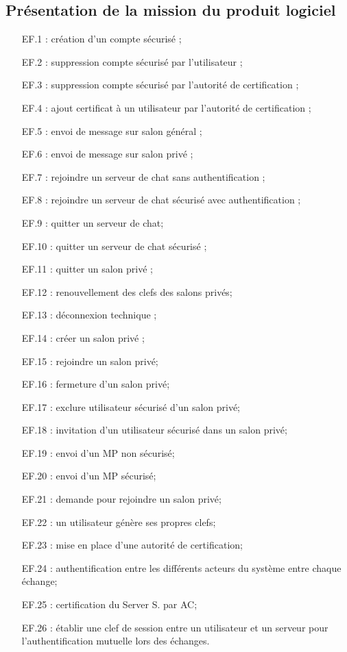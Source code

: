 \documentclass[a4paper,11pt,french]{article}
\begin{document}
\subsection{Présentation de la mission du produit logiciel}
\begin{itemize}
\item [EF.1] : création d'un compte sécurisé ;
\item [EF.2] : suppression compte sécurisé par l'utilisateur ;
\item [EF.3] : suppression compte sécurisé par l'autorité de certification ;
\item [EF.4] : ajout certificat à un utilisateur par l'autorité de certification ;
\item [EF.5] : envoi de message sur salon général ;
\item [EF.6] : envoi de message sur salon privé ;
\item [EF.7] : rejoindre un serveur de chat sans authentification ;
\item [EF.8] : rejoindre un serveur de chat sécurisé avec authentification ;
\item [EF.9] : quitter un serveur de chat;
\item [EF.10] : quitter un serveur de chat sécurisé ;
\item [EF.11] : quitter un salon privé ;
\item [EF.12] : renouvellement des clefs des salons privés;
\item [EF.13] : déconnexion technique ;
\item [EF.14] : créer un salon privé ;
\item [EF.15] : rejoindre un salon privé;
\item [EF.16] : fermeture d'un salon privé;
\item [EF.17] : exclure utilisateur sécurisé d'un salon privé;
\item [EF.18] : invitation d'un utilisateur sécurisé dans un salon privé;
\item [EF.19] : envoi d'un MP non sécurisé;
\item [EF.20] : envoi d'un MP sécurisé;
\item [EF.21] : demande pour rejoindre un salon privé;
\item [EF.22] : un utilisateur génère ses propres clefs;
\item [EF.23] : mise en place d'une autorité de certification;
\item [EF.24] : authentification entre les différents acteurs du système entre chaque échange;
\item [EF.25] : certification du Server S. par AC;
\item [EF.26] : établir une clef de session entre un utilisateur et un serveur pour l'authentification mutuelle lors des échanges.
\end{itemize}
\end{document}

